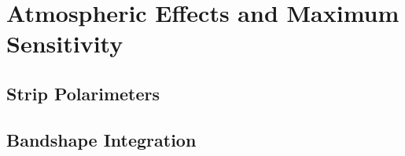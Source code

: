 \chapter{Atmospheric Effects and Maximum Sensitivity}\label{sensitivity}

\section{Strip Polarimeters}

\section{Bandshape Integration}
